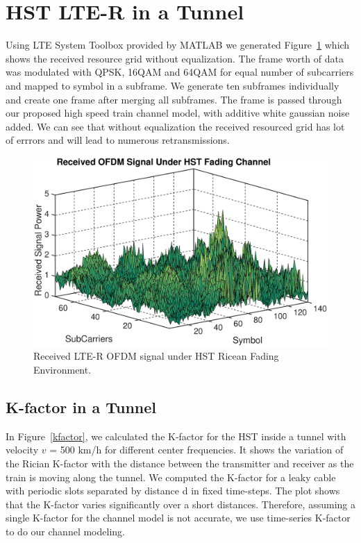 \section{HST LTE-R in a Tunnel}
Using LTE System Toolbox provided by MATLAB we generated Figure~\ref{lteofdma} which shows the received resource grid without equalization. The frame worth of data was modulated with QPSK, 16QAM and 64QAM for equal number of subcarriers and mapped to symbol in a subframe. We generate ten subframes individually and create one frame after merging all subframes. The frame is passed through our proposed high speed train channel model, with additive white gaussian noise added. We can see that without equalization the received resourced grid has lot of errrors and will lead to numerous retransmissions.

\begin{figure}[!ht]
\centering
\includegraphics[width=\textwidth,keepaspectratio]{images/Gill/lte_figs/receivedsignal.eps} 
\caption{Received LTE-R OFDM signal under HST Ricean Fading Environment.}
\label{lteofdma}
\end{figure}

\subsection{K-factor in a Tunnel}
In Figure~\ref{kfactor}, we calculated the K-factor for the HST inside a tunnel with velocity $v$ = 500 km/h for different center frequencies. It shows the variation of the Rician K-factor with the distance between the transmitter and receiver as the train is moving along the tunnel. We computed the K-factor for a leaky cable with periodic slots separated by distance d in fixed time-steps. The plot shows that the K-factor varies significantly over a short distances. Therefore, assuming a single K-factor for the channel model is not accurate, we use time-series K-factor to do our channel modeling.

